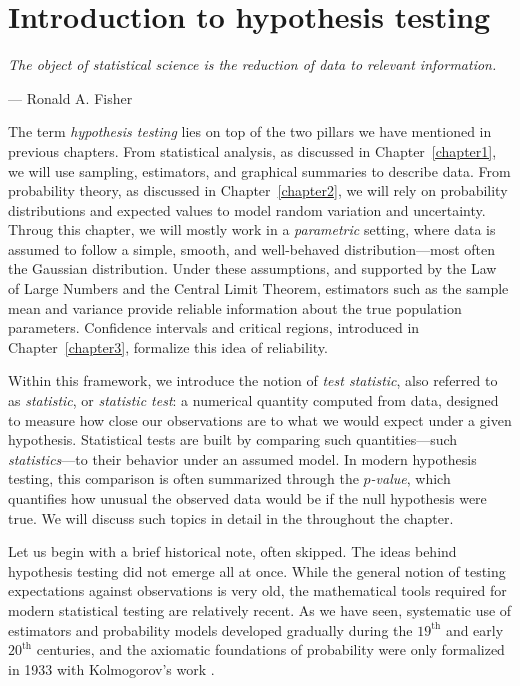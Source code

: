 \chapter{Introduction to hypothesis testing}
\label{chapter4}

\epigraph{\textit{The object of statistical science is the reduction of data to relevant information.}}{— Ronald A. Fisher}

The term \textit{hypothesis testing} lies on top of the two pillars we have mentioned in previous chapters. From statistical analysis, as discussed in Chapter~\ref{chapter1}, we will use sampling, estimators, and graphical summaries to describe data. From probability theory, as discussed in Chapter~\ref{chapter2}, we will rely on probability distributions and expected values to model random variation and uncertainty. Throug this chapter, we will mostly work in a \textit{parametric} setting, where data is assumed to follow a simple, smooth, and well-behaved distribution—most often the Gaussian distribution. Under these assumptions, and supported by the Law of Large Numbers and the Central Limit Theorem, estimators such as the sample mean and variance provide reliable information about the true population parameters. Confidence intervals and critical regions, introduced in Chapter~\ref{chapter3}, formalize this idea of reliability.

\medskip

Within this framework, we introduce the notion of \textit{test statistic}, also referred to as \textit{statistic}, or \textit{statistic test}: a numerical quantity computed from data, designed to measure how close our observations are to what we would expect under a given hypothesis. Statistical tests are built by comparing such quantities—such \textit{statistics}—to their behavior under an assumed model. In modern hypothesis testing, this comparison is often summarized through the \textit{\(p\)-value}, which quantifies how unusual the observed data would be if the null hypothesis were true. We will discuss such topics in detail in the throughout the chapter.

\medskip

Let us begin with a brief historical note, often skipped. The ideas behind hypothesis testing did not emerge all at once. While the general notion of testing expectations against observations is very old, the mathematical tools required for modern statistical testing are relatively recent. As we have seen, systematic use of estimators and probability models developed gradually during the $19^{\text{th}}$ and early $20^{\text{th}}$ centuries, and the axiomatic foundations of probability were only formalized in 1933 with Kolmogorov's work \cite{kolmogorov_1933_grundbegriffe}.

